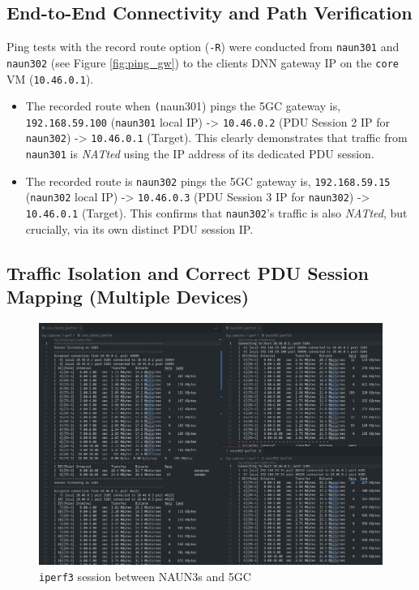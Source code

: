 \subsection{End-to-End Connectivity and Path Verification}

Ping tests with the record route option (\texttt{-R}) were conducted from \texttt{naun301} and \texttt{naun302} (see Figure \ref{fig:ping_gw}) to the clients \ac{DNN} gateway \ac{IP} on the \texttt{core} \ac{VM} (\texttt{10.46.0.1}).

\begin{itemize}
    \item The recorded route when \texttt(naun301) pings the \ac{5GC} gateway is, \texttt{192.168.59.100} (\texttt{naun301} local \ac{IP}) -> \texttt{10.46.0.2} (\ac{PDU} Session 2 \ac{IP} for \texttt{naun302}) -> \texttt{10.46.0.1} (Target). This clearly demonstrates that traffic from \texttt{naun301} is \textit{NATted} using the \ac{IP} address of its dedicated \ac{PDU} session.

    \item The recorded route is \texttt{naun302} pings the \ac{5GC} gateway is, \texttt{192.168.59.15} (\texttt{naun302} local \ac{IP}) -> \texttt{10.46.0.3} (\ac{PDU} Session 3 \ac{IP} for \texttt{naun302}) -> \texttt{10.46.0.1} (Target). This confirms that \texttt{naun302}'s traffic is also \textit{NATted}, but crucially, via its own distinct \ac{PDU} session \ac{IP}.
\end{itemize}

\subsection{Traffic Isolation and Correct \acs{PDU} Session Mapping (Multiple Devices)}

\begin{figure}
    \centering
    \includegraphics[width=1\linewidth]{figs/iperf_naun3_to_core.png}
    \caption{\texttt{iperf3} session between \acp{NAUN3} and \ac{5GC}}
    \label{fig:iperf_naun3_to_core}
\end{figure}

